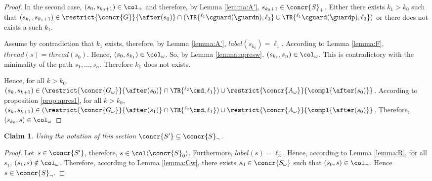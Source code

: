 \documentclass[12pt]{article}
\let\firstunion\cup
\let\firstinter\cap
\let\cup\firstunion
\let\cap\firstinter
\renewcommand{\subset}{\subseteq}
\newcommand{\li}[1]{ {}^{\ell_{#1}}  }
\newcommand{\lbl}{\mathit{label}}
\newcommand{\thread}{\mathit{thread}}
\newtheorem{claim}{Claim}
\begin{document}
\begin{proof}
In the second case, \((s_0,s_{k_0+1})\in\col_{{+}}\) and therefore, by Lemma \ref{lemma:A'}, \(s_{k_0+1}\in\concr{S}_{{+}}\).
Either there exists \(k_1>k_0\) such that \((s_{k_1},s_{k_1+1})\in \restrict{\concr{G}}{\after(s_0)}\cap(\TR{\li1\cguard(\guardn),\ell_3}\cup\TR{\li1\cguard(\guardp),\ell_3})\) or there does not exists a such \(k_1\).

Assume by contradiction that \(k_1\) exists, therefore, by Lemma \ref{lemma:A'}, \(\lbl(s_{k_0})=\ell_1\). According to Lemma \ref{lemma:F}, \(\thread(s)=\thread(s_0)\). Hence, \((s_0,s_{k_1})\in\col_{\omega}\).
So, by Lemma \ref{lemma:apresw}, \((s_{k_1},s_{n})\in\col_{\omega}\). This is contradictory with the minimality of the path \(s_1,\ldots,s_n\). Therefore \(k_1\) does not exists. 

Hence, for all \(k>k_0\), \((s_{k},s_{k+1})\in (\restrict{\concr{G_{\omega}}}{\after(s_0)}\cap\TR{\li2\cmd,\ell_1})\cup\restrict{\concr{A_{\omega}}}{\compl{\after(s_0)}}\).
According to proposition \ref{prop:apres1}, for all \(k>k_0\), \((s_{k},s_{k+1})\in (\restrict{\concr{G_{\omega}}}{\after(s_1)}\cap\TR{\li2\cmd,\ell_1})\cup\restrict{\concr{A_{\omega}}}{\compl{\after(s_0)}}\).
Therefore, \((s_{k_0},s)\in\col_{\omega}\)
\end{proof}

\begin{claim}\label{claim:WS}
 Using the notation of this section \(\concr{S'}\subset\concr{S}_{\neg}\).
 \end{claim}
\begin{proof}
 Let \(s\in\concr{S'}\), therefore, \(s\in\col\langle \concr{S}_0 \rangle\). 
 Furthermore, \(\lbl(s)=\ell_3\). Hence, according to Lemma \ref{lemma:R}, for all \(s_1\), \((s_1,s)\notin \col_{\omega}\).
 Therefore, according to Lemma \ref{lemma:Cw}, there exists \(s_0\in\concr{S_{\omega}}\) such that \((s_0,s)\in\col_{\neg}\). Hence \(s\in\concr{S}_{\neg}\). 
\end{proof}
\end{document}
